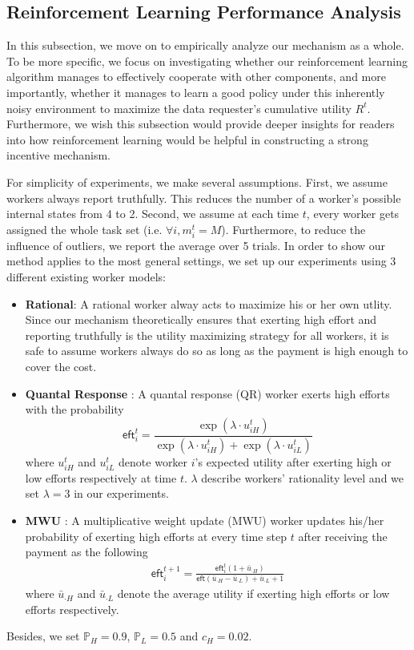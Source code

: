 \subsection{Reinforcement Learning Performance Analysis}
In this subsection, we move on to empirically analyze our mechanism as a whole. To be more specific, we focus on investigating whether our reinforcement learning algorithm manages to effectively cooperate with other components, and more importantly, whether it  manages to learn a good policy under this inherently noisy environment to maximize the data requester's cumulative utility $R^t$. Furthermore, we wish this subsection would provide deeper insights for readers into how reinforcement learning would be helpful in constructing a strong incentive mechanism.

For simplicity of experiments, we make several assumptions. First, we assume workers always report truthfully. This reduces the number of a worker's possible internal states from 4 to 2. Second, we assume at each time $t$, every worker gets assigned the whole task set (i.e. $\forall i, m_i^t = M$).  Furthermore, to reduce the influence of outliers, we report the average over 5  trials. In order to show our method applies to the most general settings, we set up our experiments using 3 different existing worker models:
\begin{itemize}
\item {\bf Rational}: A rational worker alway acts to maximize his or her own utlity. Since our mechanism theoretically ensures that exerting high effort and reporting truthfully is the utility maximizing strategy for all workers, it is safe to assume workers always do so as long as the payment is high enough to cover the cost.
\item {\bf Quantal Response} \citep{mckelvey1995quantal}: A quantal response (QR) worker exerts high efforts with the probability 
$$
\textsf{eft}_i^t= \frac{\exp(\lambda\cdot  u_{iH}^t)}{\exp(\lambda \cdot u_{iH}^t) + \exp (\lambda \cdot u_{iL}^t)}
$$
where $u_{iH}^t$ and $u_{iL}^t$ denote worker $i$'s expected utility after exerting high or low efforts respectively at time $t$. $\lambda$ describe workers' rationality level and we set $\lambda =3$ in our experiments.

\item {\bf MWU} \citep{chastain2014algorithms}: A multiplicative weight update (MWU) worker updates his/her probability of exerting high efforts at every time step $t$ after receiving the payment as the following
\begin{align*}
\textsf{eft}_i^{t+1} = \frac{\textsf{eft}_i^t(1+\bar{u}_{\cdot H})}{\textsf{eft}(\bar{u}_{\cdot H} - \bar{u}_{\cdot L}) + \bar{u}_{\cdot L} + 1}
\end{align*}
where $\bar{u}_{\cdot H}$ and $\bar{u}_{\cdot L}$ denote the average utility if exerting high efforts or low efforts respectively.
\end{itemize}
Besides, we set $\mathbb{P}_H = 0.9$, $\mathbb{P}_L = 0.5$ and $c_{H} =0.02$.


